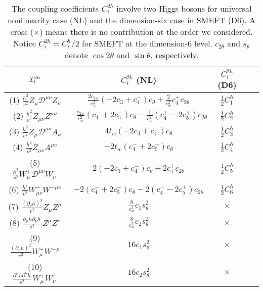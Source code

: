 \begin{table}[!h]
\begin{center}
\caption{The coupling coefficients $C_i^{2h}$ involve two Higgs bosons  for universal  nonlinearity case (NL) and the  dimension-six case in SMEFT (D6). A cross ($\times$) means there is no contribution at the order we considered. Notice $C_i^{2h}=C_i^h/2$ for  SMEFT at the dimension-6 level. $c_{2\theta}$ and $s_\theta$ denote $\cos 2\theta$ and $\sin\theta$, respectively.}\label{tab:twoh}
\begin{tabular}{c c c c c}
\hline\hline
${\cal I}^{ 2 h}_i$ &  $ C^{ 2h}_i$ (NL) &  $   C^{2h}_i$ (D6) \\
 \hline
(1) $  \frac{h^2}{v^2} Z_{\mu} {\mathcal{D}}^{\mu \nu} Z_{\nu}$ & $ \frac{2c_{ 2 w} }{c^2_{w}} ( - 2 c_3  +  c_4^-  ) c_\theta   +   \frac{2 }{c^2_{w}} c_4^+ c_{2 \theta}  $ & $\frac12 C_1^h$ 
 \\
(2) $  \frac{h^2}{v^2} Z_{\mu\nu} Z^{\mu\nu}$ & $ - \frac{c_{2 w}}{c^2_{w}}  (c_4^-  + 2 c_5^-  ) c_\theta   - \frac{1}{c^2_{w}}  (c_4^+ - 2 c_5^+ ) c_{2 \theta}   $ &$\frac12 C_2^h$ \\
(3) $  \frac{h^2}{v^2} Z_{\mu} {\mathcal{D}}^{\mu \nu} A_{\nu}$ & $ 4  t_{ w}  ( -2c_3   + c_4^- ) c_\theta $ & $\frac12 C_3^h$ \\
(4) $  \frac{h^2}{v^2} Z_{\mu\nu} A^{\mu\nu}$ & $ -2  t_{ w}   (   c_4^-  + 2 c_5^-  )  c_\theta $ &   $\frac12 C_4^h$  \\
(5)  $ \frac{h^2}{v^2} W^+_{\mu} {\mathcal{D}}^{\mu \nu} W^-_{\nu}$ & $ 2  (- 2c_3 + c_4^- ) c_\theta  + 2 c_4^+ c_{2 \theta}   $ & $\frac12 C_5^h$ \\
(6) $ \frac{h^2}{v^2} W^+_{\mu\nu} W^{-\mu\nu}$ & $  -2 ( c_4^- + 2 c_5^- )c_\theta   -2  (c_4^+  - 2 c_5^+ ) c_{2\theta}  $ &  $\frac12 C_6^h$\\
(7) $      \frac{(\partial_\nu h)^2} {v^2}Z_\mu Z^{ \mu}  $& $\frac{8 }{c^2_{w}}  c_1 s^2_\theta$ &  $\times$\\
(8)  $   \frac{\partial_\mu h \partial_\nu h}{v^2} \, Z^\mu Z^\nu  $& $\frac{8 }{c^2_{w}}  c_2  s^2_\theta$&  $\times$\\
(9) $      \frac{(\partial_\nu h)^2}{v^2} W^+_\mu W^{- \mu}  $& $16 c_1 s^2_\theta$ & $\times$ \\
(10) $  \frac{ \partial^\mu h \partial^\nu h }{v^2}\, W^+_{\mu} W^{-}_\nu  $& $16  c_2  s^2_\theta$ &  $\times$\\
\hline\hline
\end{tabular}
\end{center}
\end{table}



